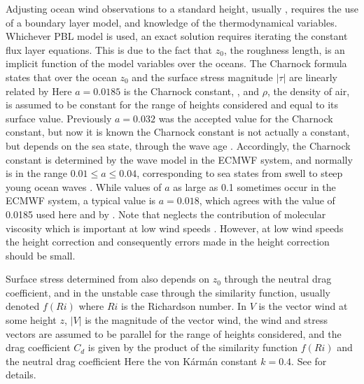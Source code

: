 \documentclass[12pt,notitlepage]{article}
\newcommand{\z}[1]{\mbox{$ z_{#1} $}}
\begin{document}
Adjusting ocean wind observations to a standard height, usually
, requires the use of a boundary layer model, and knowledge of
the thermodynamical variables.
Whichever PBL model is used, an exact solution requires iterating the
constant flux layer equations.
This is due to the fact that \z0, the roughness length, is an
implicit function of the model variables over the oceans.
The Charnock formula states that over the ocean \z0 and the surface
stress magnitude $|\tau|$ are linearly related by \eql{z0}{\z0 =
\frac{a}{\rho g}|\tau|.}
Here $a = 0.0185$ is the Charnock constant, , and $\rho$, the density of air, is assumed to be constant for
the range of heights considered and equal to its surface value.
Previously $a = 0.032$ was the accepted value for the Charnock
constant, but now it is known the Charnock constant is not actually a
constant, but depends on the sea state, through the wave age
\citep{Wu85a}.
Accordingly, the Charnock constant is determined by the wave model in
the ECMWF system, and normally is in the range $0.01 \le a \le 0.04$,
corresponding to sea states from swell to steep young ocean waves
\citep{Her11}.
While values of $a$ as large as 0.1 sometimes occur in the ECMWF
system, a typical value is $a=0.018$, which agrees with the value of
0.0185 used here and by \citet{Wu85a}.
Note that  neglects the contribution of molecular viscosity
which is important at low wind speeds \citep[\eg,][]{Her11}.
However, at low wind speeds the height correction and consequently
errors made in the height correction should be small.

Surface stress determined from  also
depends on \z0 through the neutral drag coefficient, and in the
unstable case through the similarity function, usually denoted $f(Ri)$
where $Ri$ is the Richardson number.
In  $V$ is the vector wind at some height $z$, $|V|$ is the
magnitude of the vector wind, the wind and stress vectors are assumed
to be parallel for the range of heights considered, and the drag
coefficient $C_d$ is given by the product of the similarity function
$f(Ri)$ and the neutral drag coefficient
\eql{Cdn}{C_{dn} = \left[\frac{k}{\log\left(\frac{\displaystyle z}
{\z0}\right)}\right]^2.}
Here the von K\'{a}rm\'{a}n constant $k = 0.4$.
See \cite{HofL90} for details.
\end{document}
